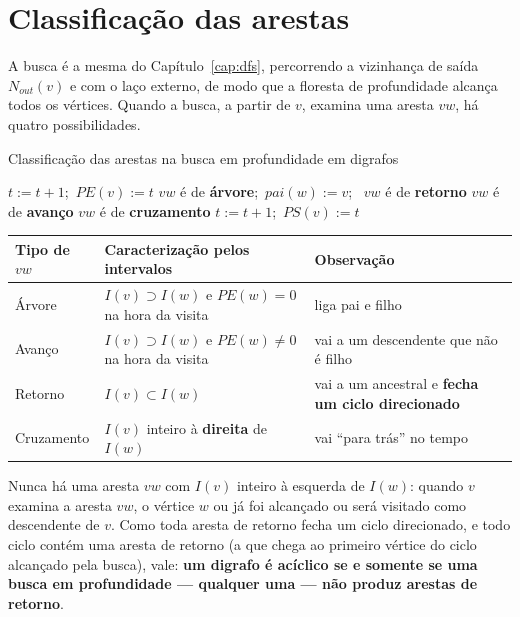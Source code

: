 \section{Classificação das arestas}\label{sec:classif}
A busca é a mesma do Capítulo~\ref{cap:dfs}, percorrendo a vizinhança de saída $N_{out}(v)$ e com o laço externo, de modo que a floresta de profundidade alcança todos os vértices. Quando a busca, a partir de $v$, examina uma aresta $vw$, há quatro possibilidades.
\begin{pseudo}{Classificação das arestas na busca em profundidade em digrafos}
\begin{algorithmic}
  \State $t:=t+1$;\ $PE(v):=t$
     \State $vw$ é de \textbf{árvore};\ $pai(w):=v$;\ 
     \State $vw$ é de \textbf{retorno} 
     \State $vw$ é de \textbf{avanço} 
    \Else \State $vw$ é de \textbf{cruzamento} 
    \EndIf
  \EndFor
  \State $t:=t+1$;\ $PS(v):=t$
\EndProcedure
\end{algorithmic}
\end{pseudo}
\begin{center}\small
\begin{tabularx}{\linewidth}{@{}l>{\raggedright\arraybackslash}p{6.2cm}X@{}}
\toprule
Tipo de $vw$ & Caracterização pelos intervalos & Observação\\
\midrule
Árvore & $I(v)\supset I(w)$ e $PE(w)=0$ na hora da visita & liga pai e filho\\
Avanço & $I(v)\supset I(w)$ e $PE(w)\ne0$ na hora da visita & vai a um descendente que não é filho\\
Retorno & $I(v)\subset I(w)$ & vai a um ancestral e \textbf{fecha um ciclo direcionado}\\
Cruzamento & $I(v)$ inteiro à \textbf{direita} de $I(w)$ & vai ``para trás'' no tempo\\
\bottomrule
\end{tabularx}
\end{center}
Nunca há uma aresta $vw$ com $I(v)$ inteiro à esquerda de $I(w)$: quando $v$ examina a aresta $vw$, o vértice $w$ ou já foi alcançado ou será visitado como descendente de $v$. Como toda aresta de retorno fecha um ciclo direcionado, e todo ciclo contém uma aresta de retorno (a que chega ao primeiro vértice do ciclo alcançado pela busca), vale: \textbf{um digrafo é acíclico se e somente se uma busca em profundidade --- qualquer uma --- não produz arestas de retorno}.

